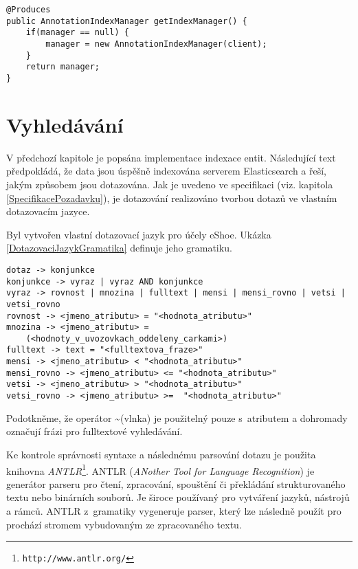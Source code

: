 \documentclass[11pt,oneside]{fithesis2}
\begin{document}
\newpage

\begin{lstlisting}[caption =  Použití CDI pro získávání správce indexu, label = AnnotationIndexerProducer]
@Produces
public AnnotationIndexManager getIndexManager() {
    if(manager == null) {
        manager = new AnnotationIndexManager(client);
    }
    return manager;
}
\end{lstlisting}

\section{Vyhledávání}
\label{ImplementaceVyhledavani}
V předchozí kapitole je popsána implementace indexace entit. Následující text předpokládá, že data jsou úspěšně indexována serverem Elasticsearch a řeší, jakým způsobem jsou dotazována. Jak je uvedeno ve specifikaci (viz. kapitola \ref{SpecifikacePozadavku}), je dotazování realizováno tvorbou dotazů ve vlastním dotazovacím jazyce.

Byl vytvořen vlastní dotazovací jazyk pro účely eShoe. Ukázka \ref{DotazovaciJazykGramatika} definuje jeho gramatiku.
\begin{lstlisting}[caption =  Gramatika dotazovacího jazyka eShoe, label = DotazovaciJazykGramatika]
dotaz -> konjunkce
konjunkce -> vyraz | vyraz AND konjunkce
vyraz -> rovnost | mnozina | fulltext | mensi | mensi_rovno | vetsi | vetsi_rovno
rovnost -> <jmeno_atributu> = "<hodnota_atributu>"
mnozina -> <jmeno_atributu> = 
	(<hodnoty_v_uvozovkach_oddeleny_carkami>)
fulltext -> text = "<fulltextova_fraze>"
mensi -> <jmeno_atributu> < "<hodnota_atributu>"
mensi_rovno -> <jmeno_atributu> <= "<hodnota_atributu>"
vetsi -> <jmeno_atributu> > "<hodnota_atributu>"
vetsi_rovno -> <jmeno_atributu> >=  "<hodnota_atributu>"
\end{lstlisting}

Podotkněme, že operátor \textasciitilde  (vlnka) je použitelný pouze s~atributem  a dohromady označují frázi pro fulltextové vyhledávání.

Ke kontrole správnosti syntaxe a následnému parsování dotazu je použita knihovna \emph{ANTLR}\footnote{\texttt{http://www.antlr.org/}}. ANTLR (\emph{ANother Tool for Language Recognition}) je generátor parseru pro čtení, zpracování, spouštění či překládání strukturovaného textu nebo binárních souborů. Je široce používaný pro vytváření jazyků, nástrojů a rámců. ANTLR z~gramatiky vygeneruje parser, který lze následně použít pro prochází stromem vybudovaným ze zpracovaného textu. \cite{ANTLR}
\end{document}
